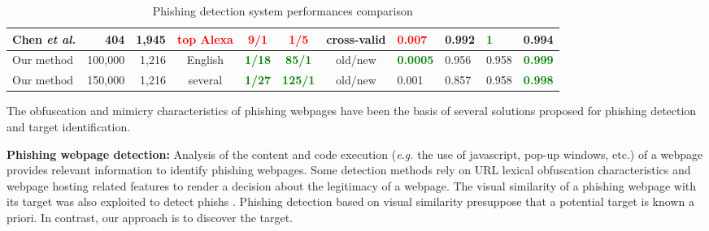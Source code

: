 \documentclass[10pt,conference,compsocconf,letterpaper]{IEEEtran}
\begin{document}
\begin{table*}[tbh]
\begin{tabular}{l r r c c c c l l l l }
Chen \textit{et al.} \cite{Chen:2014:anti} & 404 & 1,945 & \textbf{\textcolor{red}{top Alexa}} & \textbf{\textcolor{red}{9/1}} & \textbf{\textcolor{red}{1/5}} & cross-valid & \textbf{\textcolor{red}{0.007}} & 0.992& \textbf{\textcolor{green}{1}}  & 0.994 \\ \hline
Our method & 100,000 & 1,216 & English & \textbf{\textcolor{green}{1/18}} & \textbf{\textcolor{green}{85/1}} & old/new & \textbf{\textcolor{green}{0.0005}} & 0.956  & 0.958 & \textbf{\textcolor{green}{0.999}} \\
Our method & 150,000 & 1,216 & several & \textbf{\textcolor{green}{1/27}} & \textbf{\textcolor{green}{125/1}} & old/new & 0.001 & 0.857  & 0.958 & \textbf{\textcolor{green}{0.998}} 
\end{tabular}
\caption{Phishing detection system performances comparison}
\label{tab:compare}
\end{table*}

The obfuscation and mimicry characteristics of phishing webpages have been the basis of several solutions proposed for phishing detection and target identification.

\textbf{Phishing webpage detection:}
Analysis of the content \cite{Xiang:2009:hybrid,zhang:2007:cantina} and code execution (\textit{e.g.} the use of javascript, pop-up windows, etc.) \cite{Mohammad:2014:predicting} of a webpage provides relevant information to identify phishing webpages. Some detection methods rely on URL lexical obfuscation characteristics \cite{le:2011:phishdef,marchal:2014:phishstorm} and webpage hosting related features \cite{Feroz:2014:examination,Ma:2009:beyond} to render a decision about the legitimacy of a webpage.
The visual similarity of a phishing webpage with its target was also exploited to detect phishs \cite{Chen:2014:anti,Medvet:2008:visual}.
Phishing detection based on visual similarity presuppose that a potential target is known a priori. In contrast, our approach is to discover the target. 
\end{document}
